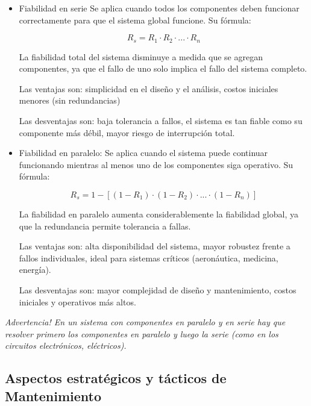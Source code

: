\documentclass[a4paper,oneside,11pt]{article}
\begin{document}
\begin{itemize}
    \item Fiabilidad en serie
    Se aplica cuando todos los componentes deben funcionar correctamente para que el sistema global funcione. Su fórmula:

    \begin{equation*}
        R_{s} = R_{1} \cdot R_{2} \cdot ... \cdot R_{n}
    \end{equation*}

    La fiabilidad total del sistema disminuye a medida que se agregan componentes, ya que el fallo de uno solo implica el fallo del sistema completo.

    Las ventajas son: simplicidad en el diseño y el análisis, costos iniciales menores (sin redundancias)

    Las desventajas son: baja tolerancia a fallos, el sistema es tan fiable como su componente más débil, mayor riesgo de interrupción total.

    \item Fiabilidad en paralelo:
    Se aplica cuando el sistema puede continuar funcionando mientras al menos uno de los componentes siga operativo. Su fórmula: 

    \begin{equation*}
        R_{s} = 1 - [(1-R_{1}) \cdot (1-R_{2}) \cdot ... \cdot (1-R_{n})]
    \end{equation*}

    La fiabilidad en paralelo aumenta considerablemente la fiabilidad global, ya que la redundancia permite tolerancia a fallas.

    Las ventajas son: alta disponibilidad del sistema, mayor robustez frente a fallos individuales, ideal para sistemas críticos (aeronáutica, medicina, energía).

    Las desventajas son: mayor complejidad de diseño y mantenimiento, costos iniciales y operativos más altos.
    
\end{itemize}

\textit{Advertencia! En un sistema con componentes en paralelo y en serie hay que resolver primero los componentes en paralelo y luego la serie (como en los circuitos electrónicos, eléctricos).}

\subsection{Aspectos estratégicos y tácticos de Mantenimiento}
\end{document}
